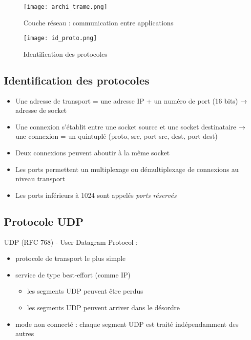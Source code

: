\documentclass[journal, a4paper]{IEEEtran}
\begin{document}
	\begin{figure}[!hbt]
		\begin{center}
		\texttt{[image: archi\_trame.png]}
		\caption{Couche réseau : communication entre applications}
		\label{fig:archi_trame}
		\end{center}
	\end{figure}
	
	\begin{figure}[!hbt]
		\begin{center}
		\texttt{[image: id\_proto.png]}
		\caption{Identification des protocoles}
		\label{fig:id_proto}
		\end{center}
	\end{figure}
	
	\subsection{Identification des protocoles}
	\begin{itemize}
		\item Une adresse de transport = une adresse IP + un numéro de
port (16 bits) → adresse de socket
		\item Une connexion s’établit entre une socket source et une socket
destinataire → une connexion = un quintuplé (proto, src, port
src, dest, port dest)
		\item Deux connexions peuvent aboutir à la même socket
		\item Les ports permettent un multiplexage ou démultiplexage de
connexions au niveau transport
		\item Les ports inférieurs à 1024 sont appelés \textit{ports réservés}
	\end{itemize}
	
	\subsection{Protocole UDP}
	UDP (RFC 768) - User Datagram Protocol :
	
	\begin{itemize}
		\item protocole de transport le plus simple
		\item service de type best-effort (comme IP)
		\begin{itemize}
			\item les segments UDP peuvent être perdus
			\item les segments UDP peuvent arriver dans le désordre
		\end{itemize}
		\item  mode non connecté : chaque segment UDP est traité
indépendamment des autres
	\end{itemize}
	
\end{document}
